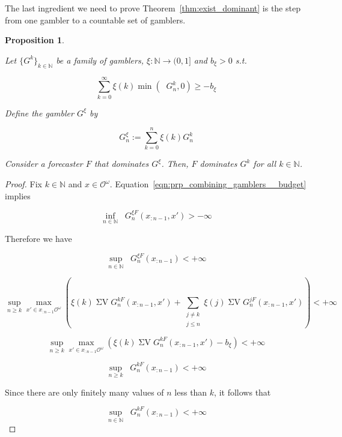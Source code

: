 \documentclass[11pt]{article}
\theoremstyle{definition}
\theoremstyle{plain}
\newtheorem{proposition}{Proposition}%
\newcommand{\Nats}{\mathbb{N}}
\newcommand{\Sq}[2]{\{#1\}_{#2 \in \Nats}}
\newcommand{\Ob}{\mathcal{O}}
\newcommand{\OO}{\Ob^\omega}
\DeclareMathOperator{\SV}{\Sigma V}
\DeclareMathOperator{\SVM}{\Sigma V_{\min}}
\DeclareMathOperator{\SVX}{\Sigma V_{\max}}
\begin{document}
The last ingredient we need to prove Theorem~\ref{thm:exist_dominant} is the step from one gambler to a countable set of gamblers.

\begin{proposition}
\label{prp:combining_gamblers}

Let $\Sq{G^k}{k}$ be a family of gamblers, $\xi: \Nats \rightarrow (0,1]$ and $b_\xi > 0$ s.t.

\begin{equation}
\label{eqn:prp_combining_gamblers__budget}
\sum_{k = 0}^\infty \xi(k) \min(\SVM G^k_n,0) \geq -b_\xi
\end{equation}

Define the gambler $G^\xi$ by

\begin{equation}
G^\xi_n := \sum_{k = 0}^n \xi(k) G^k_n
\end{equation}

Consider a forecaster $F$ that dominates $G^\xi$. Then, $F$ dominates $G^k$ for all $k \in \Nats$.

\end{proposition}

\begin{proof}

Fix $k \in \Nats$ and $x \in \OO$. Equation~\ref{eqn:prp_combining_gamblers__budget} implies

\[\inf_{n \in \Nats} \SVM G^{\xi F}_{n}(x_{:n-1},x') > -\infty\]

Therefore we have

\[\sup_{n \in \Nats} \SVX G^{\xi F}_{n}(x_{:n-1}) < +\infty\]

\[\sup_{n \geq k} \max_{x' \in x_{:n-1}\OO} (\xi(k) \SV G^{k F}_{n}(x_{:n-1},x') + \sum_{\substack{j \ne k\\ j \leq n}} \xi(j) \SV G^{j F}_{n}(x_{:n-1},x')) < +\infty\]

\[\sup_{n \geq k} \max_{x' \in x_{:n-1}\OO} (\xi(k) \SV G^{k F}_{n}(x_{:n-1},x') - b_\xi) < +\infty\]

\[\sup_{n \geq k} \SVX G^{k F}_{n}(x_{:n-1}) < +\infty\]

Since there are only finitely many values of $n$ less than $k$, it follows that

\[\sup_{n \in \Nats} \SVX G^{k F}_{n}(x_{:n-1}) < +\infty\]
\end{proof}
\end{document}
